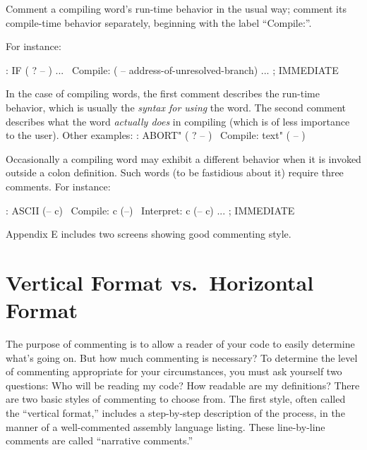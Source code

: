 \begin{tip}
Comment a compiling word's run-time behavior in the usual way; comment
its compile-time behavior separately, beginning with the label ``Compile:''.
\end{tip}
For instance:
\begin{Code}
: IF   ( ? -- ) ...
\ Compile:   ( -- address-of-unresolved-branch)
   ... ; IMMEDIATE
\end{Code}
In the case of compiling words, the first comment describes the run-time
behavior, which is usually the \emph{syntax for using} the word.  The second comment
describes what the word \emph{actually does} in compiling (which is of less
importance to the user).
Other examples:
: ABORT"  ( ? -- )
\ Compile:    text"   ( -- )

Occasionally a compiling word may exhibit a different behavior when it is
invoked outside a colon definition.  Such words (to be fastidious about it)
require three comments.  For instance:
\begin{Code}
: ASCII  (-- c)
\ Compile:   c   (--)
\ Interpret:   c   (-- c)
     ... ; IMMEDIATE
\end{Code}
Appendix E includes two screens showing good commenting style.

\othersidetrue\section{Vertical Format vs.\ Horizontal Format}
\othersidefalse
The purpose of commenting is to allow a reader of your code to easily
determine what's going on.  But how much commenting is necessary? To
determine the level of commenting appropriate for your circumstances,
you must ask yourself two questions:
Who will be reading my code?
How readable are my definitions?
There are two basic styles of commenting to choose from.  The first style,
often called the ``vertical format,'' includes a step-by-step description of
the process, in the manner of a well-commented assembly language
listing.  These line-by-line comments are called ``narrative comments.''

